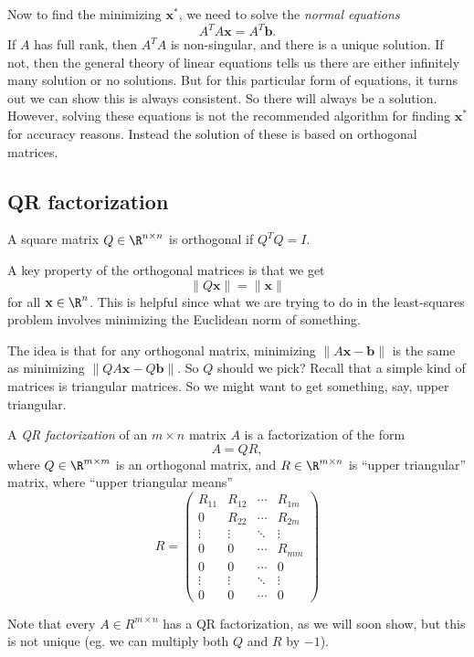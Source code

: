 \documentclass[a4paper]{article}
\begin{document}
Now to find the minimizing $\mathbf{x}^*$, we need to solve the \emph{normal equations}
\[
  A^T A\mathbf{x} = A^T \mathbf{b}.
\]
If $A$ has full rank, then $A^T A$ is non-singular, and there is a unique solution. If not, then the general theory of linear equations tells us there are either infinitely many solution or no solutions. But for this particular form of equations, it turns out we can show this is always consistent. So there will always be a solution. However, solving these equations is not the recommended algorithm for finding $\mathbf{x}^*$ for accuracy reasons. Instead the solution of these is based on orthogonal matrices.

\subsection{QR factorization}
\begin{defi}
  A square matrix $Q \in \R^{n \times n}$ is orthogonal if $Q^T Q = I$.
\end{defi}

A key property of the orthogonal matrices is that we get
\[
  \|Q\mathbf{x}\| = \|\mathbf{x}\|
\]
for all $\mathbf{x} \in \R^n$. This is helpful since what we are trying to do in the least-squares problem involves minimizing the Euclidean norm of something.

The idea is that for any orthogonal matrix, minimizing $\|A\mathbf{x} - \mathbf{b}\|$ is the same as minimizing $\|QA \mathbf{x} - Q\mathbf{b}\|$. So $Q$ should we pick? Recall that a simple kind of matrices is triangular matrices. So we might want to get something, say, upper triangular.

\begin{defi}[QR factorization]
  A \emph{QR factorization} of an $m \times n$ matrix $A$ is a factorization of the form
  \[
    A = QR,
  \]
  where $Q \in \R^{m \times m}$ is an orthogonal matrix, and $R \in \R^{m \times n}$ is ``upper triangular'' matrix, where ``upper triangular means''
  \[
    R =
    \begin{pmatrix}
      R_{11} & R_{12} & \cdots & R_{1m}\\
      0 & R_{22} & \cdots & R_{2m}\\
      \vdots & \vdots & \ddots & \vdots\\
      0 & 0 & \cdots & R_{mm}\\
      0 & 0 & \cdots & 0\\
      \vdots & \vdots & \ddots & \vdots\\
      0 & 0 & \cdots & 0
    \end{pmatrix}
  \]
\end{defi}
Note that every $A \in R^{m \times n}$ has a QR factorization, as we will soon show, but this is not unique (eg. we can multiply both $Q$ and $R$ by $-1$).
\end{document}
